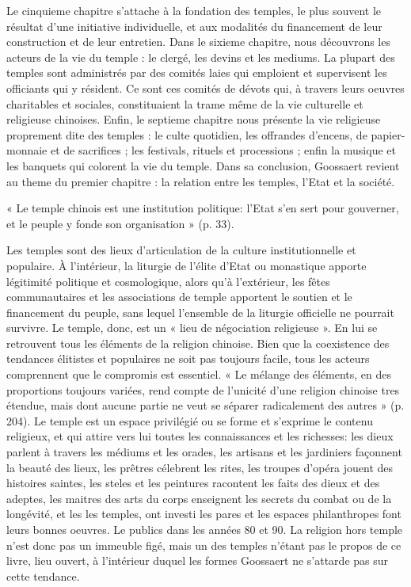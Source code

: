 \begin{singlequote}
Le cinquieme chapitre s'attache à la fondation
des temples, le plus souvent le résultat d'une initiative individuelle, et aux modalités du financement de leur construction et de leur entretien.
Dans le sixieme chapitre, nous découvrons les acteurs de la vie du temple : le clergé, les devins et les mediums. La plupart des temples sont administrés par des comités laies qui emploient et supervisent les officiants qui y résident. Ce sont ces comités de dévots qui, à travers leurs oeuvres charitables et sociales, constituaient la trame même de la vie culturelle et religieuse chinoises. Enfin, le septieme chapitre nous présente la vie religieuse proprement dite des temples : le culte quotidien, les offrandes d'encens, de papier-monnaie et de sacrifices ; les festivals, rituels et processions ; enfin la musique et les banquets qui colorent la vie du temple.
Dans sa conclusion, Goossaert revient au theme du premier chapitre : la relation entre les temples, l'Etat et la société. \begin{singlequote}
    « Le temple chinois est une institution politique: l'Etat s'en sert pour gouverner, et le peuple y fonde son organisation » (p. 33).
\end{singlequote} Les temples sont des lieux d'articulation de la culture institutionnelle et populaire. À l'intérieur, la liturgie de l'élite d'Etat ou monastique apporte légitimité politique et cosmologique, alors qu'à l'extérieur, les fêtes communautaires et les associations de temple apportent le soutien et le financement du peuple, sans lequel l'ensemble de la liturgie officielle ne pourrait survivre. Le temple, donc, est un « lieu de négociation religieuse ». En lui se retrouvent tous les éléments de la religion chinoise. Bien que la coexistence des tendances élitistes et populaires ne soit pas toujours facile, tous les acteurs comprennent que le compromis est essentiel. « Le mélange des éléments, en des proportions toujours variées, rend compte de l'unicité d'une religion chinoise tres étendue, mais dont aucune partie ne veut se séparer radicalement des autres » (p. 204). Le temple est un espace privilégié ou se forme et s'exprime le contenu religieux, et qui attire vers lui toutes les connaissances et les richesses: les dieux parlent à travers les médiums et les orades, les artisans et les jardiniers façonnent la beauté des lieux, les prêtres célebrent les rites, les troupes d'opéra jouent des histoires saintes, les steles et les peintures racontent les faits des dieux et des adeptes, les maitres des arts du corps enseignent 
les secrets du combat ou de la longévité, et les les temples, ont investi les pares et les espaces philanthropes font leurs bonnes oeuvres. Le publics dans les années 80 et 90. La religion hors temple n'est donc pas un immeuble figé, mais un des temples n'étant pas le propos de ce livre, lieu ouvert, à l'intérieur duquel les formes Goossaert ne s'attarde pas sur cette tendance.  

\end{singlequote}
